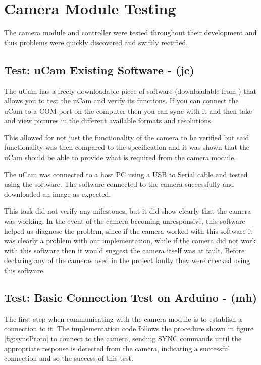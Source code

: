 \section{Camera Module Testing}

The camera module and controller were tested throughout their development and thus problems were quickly discovered and swiftly rectified.

\subsection{Test: uCam Existing Software - (jc)}
\label{sec:existing_software_test}

The uCam has a freely downloadable piece of software (downloadable from \cite{ucam_test_software}) that allows you to test the uCam and verify its functions. If you can connect the uCam to a COM port on the computer then you can sync with it and then take and view pictures in the different available formats and resolutions.

This allowed for not just the functionality of the camera to be verified but said functionality was then compared to the specification and it was shown that the uCam should be able to provide what is required from the camera module.

The uCam was connected to a host PC using a USB to Serial cable and tested using the software. The software connected to the camera successfully and downloaded an image as expected.

This task did not verify any milestones, but it did show clearly that the camera was working. In the event of the camera becoming unresponsive, this software helped us diagnose the problem, since if the camera worked with this software it was clearly a problem with our implementation, while if the camera did not work with this software then it would suggest the camera itself was at fault. Before declaring any of the cameras used in the project faulty they were checked using this software.

\subsection{Test: Basic Connection Test on Arduino - (mh)}
\label{sec:basic_connection_test}

The first step when communicating with the camera module is to establish a connection to it.  The implementation code follows the procedure shown in figure \ref{fig:syncProto} to connect to the camera, sending SYNC commands until the appropriate response is detected from the camera, indicating a successful connection and so the success of this test.

